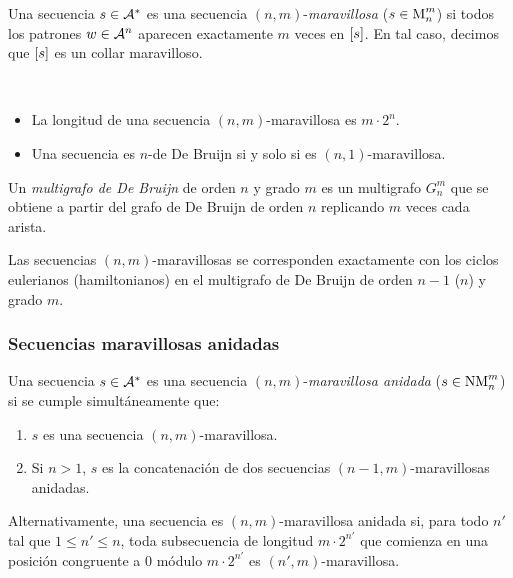 \documentclass[11pt]{article}
\begin{document}
\begin{definition}
	Una secuencia $s \in \mathcal{A}^*$ es una secuencia $(n,m)$-\emph{maravillosa}
	($s \in \text{M}_{n}^{m}$) si todos los patrones $w \in \mathcal{A}^n$ aparecen
	exactamente $m$ veces en $\left[s\right]$. En tal caso, decimos que $\left[s\right]$ es
	un collar maravilloso.
\end{definition}

\begin{remark}\ %
	\begin{itemize}
		\item La longitud de una secuencia $(n,m)$-maravillosa es $m \cdot 2^n$.
		\item Una secuencia es $n$-de De Bruijn si y solo si es
		      $(n,1)$-maravillosa.
	\end{itemize}
\end{remark}

\begin{definition}
	Un \emph{multigrafo de De Bruijn} de orden $n$ y grado $m$ es un multigrafo
	$G_n^m$ que se obtiene a partir del grafo de De Bruijn de orden $n$
	replicando $m$ veces cada arista.
\end{definition}

\begin{remark}
	Las secuencias $(n,m)$-maravillosas se corresponden exactamente con los
	ciclos eulerianos (hamiltonianos) en el multigrafo de De Bruijn de orden $n -
		1$ ($n$) y grado $m$.
\end{remark}

\subsubsection{Secuencias maravillosas anidadas}

\begin{definition}
	Una secuencia $s \in \mathcal{A}^*$ es una secuencia $(n,m)$-\emph{maravillosa
		anidada} ($s \in \text{NM}_{n}^{m}$) si se cumple simultáneamente que:
	\begin{enumerate}
		\item $s$ es una secuencia $(n,m)$-maravillosa.
		\item Si $n > 1$, $s$ es la concatenación de dos secuencias
		      $(n-1,m)$-maravillosas anidadas.
	\end{enumerate}

	Alternativamente, una secuencia es $(n,m)$-maravillosa anidada si, para todo
	$n'$ tal que $1 \leq n' \leq n$, toda subsecuencia de longitud
	$m \cdot 2^{n'}$ que comienza en una posición congruente a $0$ módulo
	$m \cdot 2^{n'}$ es $(n',m)$-maravillosa.
\end{definition}
\end{document}
